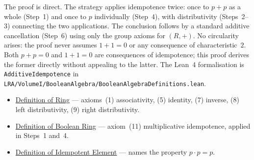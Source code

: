\begin{remark*}
The proof is direct.
The strategy applies idempotence twice: once to $p + p$ as a
whole (Step~1) and once to $p$ individually (Step~4), with
distributivity (Steps~2--3) connecting the two applications.
The conclusion follows by a standard additive cancellation
(Step~6) using only the group axioms for $(R,+)$.
No circularity arises: the proof never assumes $1 + 1 = 0$
or any consequence of characteristic~$2$.
Both $p + p = 0$ and $1 + 1 = 0$ are consequences of
idempotence; this proof derives the former directly without
appealing to the latter.
The Lean~4 formalisation is \texttt{AdditiveIdempotence} in
\texttt{LRA/VolumeI/BooleanAlgebra/BooleanAlgebraDefinitions.lean}.
\end{remark*}

\begin{dependencies}
\begin{itemize}
  \item \hyperref[def:algebraic-ring]{Definition of Ring}
        --- axioms~(1) associativity, (5) identity, (7) inverse,
        (8) left distributivity, (9) right distributivity.
  \item \hyperref[def:boolean-ring]{Definition of Boolean Ring}
        --- axiom~(11) multiplicative idempotence,
        applied in Steps~1 and~4.
  \item \hyperref[def:idempotent-element]{Definition of Idempotent Element}
        --- names the property $p \cdot p = p$.
\end{itemize}
\end{dependencies}

\clearpage
